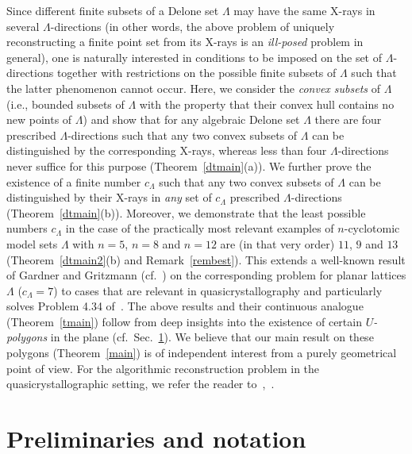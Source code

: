 \documentclass[a4paper]{amsart}
\theoremstyle{definition}
\numberwithin{equation}{section}
\numberwithin{theorem}{section}
\begin{document}
Since different finite subsets of a Delone set $\varLambda$ may have the same X-rays in several
$\varLambda$-directions (in other words, the above problem of uniquely
reconstructing a finite point set from its X-rays is an
{\em ill-posed}\/ problem in general), one is naturally interested in conditions
to be imposed
on the set of $\varLambda$-directions together with restrictions on
the possible finite subsets of
$\varLambda$ such that the latter phenomenon
cannot occur. Here, we consider the {\em convex subsets}
of $\varLambda$ (i.e., bounded subsets of $\varLambda$ with
the property that their convex hull contains no new points of $\varLambda$) and show that for any algebraic Delone
set $\varLambda$ there are four prescribed $\varLambda$-directions such that any two convex subsets of
$\varLambda$ can be distinguished by the corresponding X-rays,
whereas less than four $\varLambda$-directions never suffice for this
purpose (Theorem~\ref{dtmain}(a)). We
further prove the existence of a finite number
$c_{\varLambda}$ such that any two convex subsets of $\varLambda$
can be distinguished by their X-rays in {\em any} set of
$c_{\varLambda}$ prescribed
$\varLambda$-directions (Theorem~\ref{dtmain}(b)). Moreover, we
demonstrate that the
least possible numbers $c_{\varLambda}$ in the
case of the practically most relevant examples of $n$-cyclotomic model
sets $\varLambda$ with $n=5$, $n=8$ and $n=12$ are (in that
 very order) $11$, $9$ and $13$ (Theorem~\ref{dtmain2}(b) and Remark~\ref{rembest}). This extends a well-known result of Gardner
and Gritzmann (cf.~\cite[Thm.~5.7]{GG}) on the corresponding
problem for planar lattices $\varLambda$ ($c_{\varLambda}=7$) to
cases that are relevant in quasicrystallography and particularly solves Problem
4.34 of~\cite{H5}. The above results and their continuous analogue 
(Theorem~\ref{tmain})  follow from deep insights into the existence
of certain {\em $U$-polygons} in the plane (cf.~Sec.~\ref{sec1}). We believe that our main
result on these polygons (Theorem~\ref{main}) is of independent
interest from a purely geometrical point of view.  For the algorithmic 
reconstruction problem in the quasicrystallographic setting, we refer
the reader to~\cite{BG2},~\cite{H2}.

        

\section{Preliminaries and notation}\label{sec1}
\end{document}
